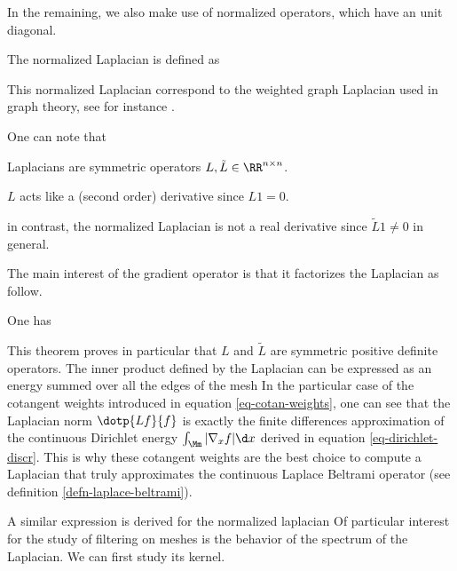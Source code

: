 In the remaining, we also make use of normalized operators, which have an unit diagonal.

\begin{defn} The normalized Laplacian is defined as
\end{defn}

This normalized Laplacian correspond to the weighted graph Laplacian used in graph theory, see for instance \cite{chung-graph}.

\begin{rem} One can note that
\begin{rs}
	\item Laplacians are symmetric operators $L,\tilde L \in \RR^{n \times n}$.
	\item $L$ acts like a (second order) derivative since $L1=0$.
	\item in contrast, the normalized Laplacian is not a real derivative since $\tilde L1 \neq 0$ in general.
\end{rs}
\end{rem}

The main interest of the gradient operator is that it factorizes the Laplacian as follow. 

\begin{thm} One has
\end{thm}

This theorem proves in particular that $L$ and $\tilde L$ are symmetric positive definite operators. The inner product defined by the Laplacian can be expressed as an energy summed over all the edges of the mesh
In the particular case of the cotangent weights introduced in equation \eqref{eq-cotan-weights}, one can see that the Laplacian norm $\dotp{L f}{f}$ is exactly the finite differences approximation of the continuous Dirichlet energy $\int_{\Mm} |\nabla_x f| \d x$ derived in equation \eqref{eq-dirichlet-discr}. This is why these cotangent weights are the best choice to compute a Laplacian that truly approximates the continuous Laplace Beltrami operator (see definition \ref{defn-laplace-beltrami}). 

A similar expression is derived for the normalized laplacian
Of particular interest for the study of filtering on meshes is the behavior of the spectrum of the Laplacian. We can first study its kernel.

